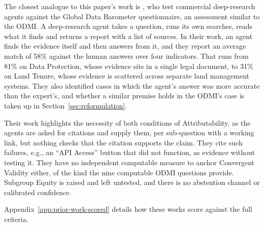 The closest analogue to this paper's work is \citet{fumega2026}, who test commercial deep-research agents against the Global Data Barometer questionnaire, an assessment similar to the ODMI. A deep-research agent takes a question, runs its own searches, reads what it finds and returns a report with a list of sources. In their work, an agent finds the evidence itself and then answers from it, and they report an average match of 58\% against the human answers over four indicators. That runs from 81\% on Data Protection, whose evidence sits in a single legal document, to 31\% on Land Tenure, whose evidence is scattered across separate land management systems. They also identified cases in which the agent's answer was more accurate than the expert's, and whether a similar premise holds in the ODMI's case is taken up in Section~\ref{sec:reformulation}.

Their work highlights the necessity of both conditions of Attributability, as the agents are asked for citations and supply them, per sub-question with a working link, but nothing checks that the citation supports the claim. They cite such failures, e.g., an ``API Access'' button that did not function, as evidence without testing it. They have no independent computable measure to anchor Convergent Validity either, of the kind the nine computable ODMI questions provide. Subgroup Equity is raised and left untested, and there is no abstention channel or calibrated confidence.

Appendix~\ref{app:prior-work-scored} details how these works score against the full criteria.

